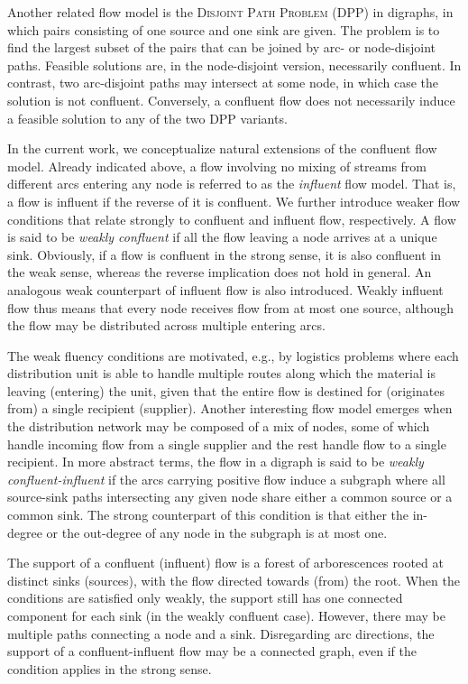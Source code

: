 \documentclass[pdflatex,sn-mathphys-num]{sn-jnl}%
\theoremstyle{thmstyleone}%
\begin{document}
Another related flow model is the \textsc{Disjoint Path Problem} (DPP) \citep{kolliopoulos07} in digraphs, in which pairs consisting of one source and one sink are given.
The problem is to find the largest subset of the pairs that can be joined by arc- or node-disjoint paths.
Feasible solutions are, in the node-disjoint version, necessarily confluent.
In contrast, two arc-disjoint paths may intersect at some node, in which case the solution is not confluent.
Conversely, a confluent flow does not necessarily induce a feasible solution to any of the two DPP variants.

In the current work, we conceptualize natural extensions of the confluent flow model.
Already indicated above, a flow involving no mixing of streams from different arcs entering any node is referred to as the \emph{influent} flow model.
That is, a flow is influent if the reverse of it is confluent.
We further introduce weaker flow conditions that relate strongly to confluent and influent flow, respectively.
A flow is said to be \emph{weakly confluent} if all the flow leaving a node arrives at a unique sink.
Obviously, if a flow is confluent in the strong sense, it is also confluent in the weak sense, whereas the reverse implication does not hold in general.
An analogous weak counterpart of influent flow is also introduced.
Weakly influent flow thus means that every node receives flow from at most one source, although the flow may be distributed across multiple entering arcs.

The weak fluency conditions are motivated, e.g., by logistics problems where each distribution unit is able to handle multiple routes along which the material
is leaving (entering) the unit, given that the entire flow is destined for (originates from) a single recipient (supplier).
Another interesting flow model emerges when the distribution network may be composed of a mix of nodes,
some of which handle incoming flow from a single supplier and the rest handle flow to a single recipient.
In more abstract terms, the flow in a digraph is said to be \emph{weakly confluent-influent} if the arcs carrying positive flow induce a subgraph
where all source-sink paths intersecting any given node share either a common source or a common sink.
The strong counterpart of this condition is that either the in-degree or the out-degree of any node in the subgraph is at most one.

The support of a confluent (influent) flow is a forest of arborescences rooted at distinct sinks (sources), with the flow directed towards (from) the root.
When the conditions are satisfied only weakly, the support still has one connected component for each sink (in the weakly confluent case).
However, there may be multiple paths connecting a node and a sink.
Disregarding arc directions, the support of a confluent-influent flow may be a connected graph, even if the condition applies in the strong sense.
\end{document}
